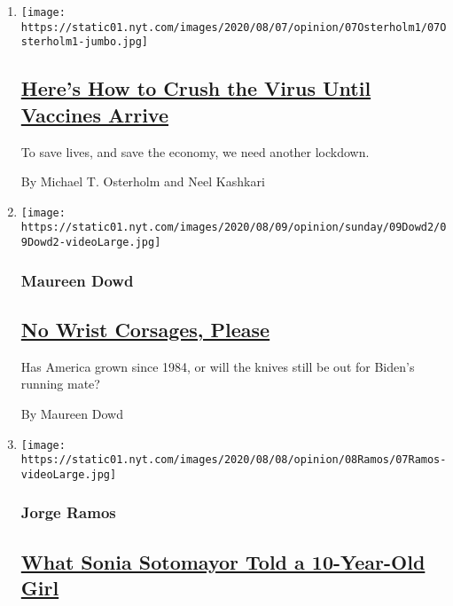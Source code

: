 \begin{enumerate}
\def\labelenumi{\arabic{enumi}.}
\item
  \texttt{[image: https://static01.nyt.com/images/2020/08/07/opinion/07Osterholm1/07Osterholm1-jumbo.jpg]}

  \hypertarget{heres-how-to-crush-the-virus-until-vaccines-arrive}{%
  \subsection{\texorpdfstring{\href{/2020/08/07/opinion/coronavirus-lockdown-unemployment-death.html}{Here's
  How to Crush the Virus Until Vaccines
  Arrive}}{Here's How to Crush the Virus Until Vaccines Arrive}}\label{heres-how-to-crush-the-virus-until-vaccines-arrive}}

  To save lives, and save the economy, we need another lockdown.

  By Michael T. Osterholm and Neel Kashkari
\item
  \texttt{[image: https://static01.nyt.com/images/2020/08/09/opinion/sunday/09Dowd2/09Dowd2-videoLarge.jpg]}

  \hypertarget{maureen-dowd}{%
  \subsubsection{Maureen Dowd}\label{maureen-dowd}}

  \hypertarget{no-wrist-corsages-please}{%
  \subsection{\texorpdfstring{\href{/2020/08/08/opinion/sunday/biden-vice-president-geraldine-ferraro.html}{No
  Wrist Corsages,
  Please}}{No Wrist Corsages, Please}}\label{no-wrist-corsages-please}}

  Has America grown since 1984, or will the knives still be out for
  Biden's running mate?

  By Maureen Dowd
\item
  \texttt{[image: https://static01.nyt.com/images/2020/08/08/opinion/08Ramos/07Ramos-videoLarge.jpg]}

  \hypertarget{jorge-ramos}{%
  \subsubsection{Jorge Ramos}\label{jorge-ramos}}

  \hypertarget{what-sonia-sotomayor-told-a-10-year-old-girl}{%
  \subsection{\texorpdfstring{\href{/2020/08/07/opinion/latina-women-politics.html}{What
  Sonia Sotomayor Told a 10-Year-Old
  Girl}}{What Sonia Sotomayor Told a 10-Year-Old Girl}}\label{what-sonia-sotomayor-told-a-10-year-old-girl}}


\end{enumerate}
